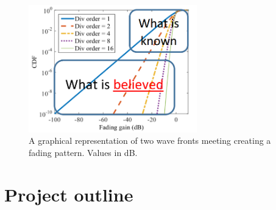 \begin{figure}[H]
\centering
\includegraphics[width=0.65\textwidth]{figures/fading_gain.png}
\caption{A graphical representation of two wave fronts meeting creating a fading pattern. Values in dB.}
\label{fading_gain}
\end{figure}


\section{Project outline}





